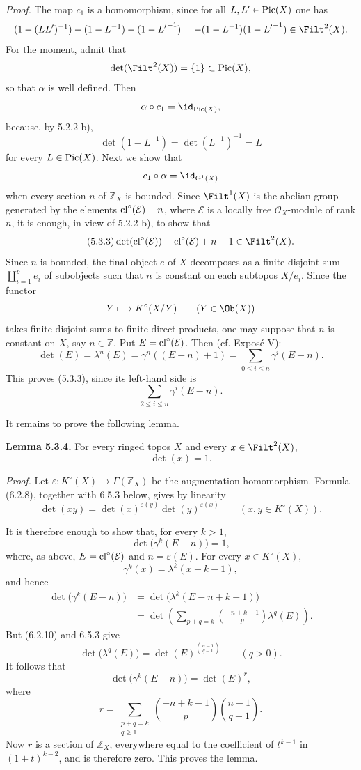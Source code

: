 \emph{Proof.}
The map $c_1$ is a homomorphism, since for all $L,L'\in\operatorname{Pic}(X)$ one has
\[
(1-(LL')^{-1})-(1-L^{-1})-(1-{L'}^{-1})
=-(1-L^{-1})(1-{L'}^{-1})\in\Filt^2(X).
\]
For the moment, admit that
\[
\det(\Filt^2(X))=\{1\}\subset\Pic(X),
\]
so that $\alpha$ is well defined. Then
\[
\alpha\circ c_1=\id_{\Pic(X)},
\]
because, by 5.2.2 b),
\[
\det(1-L^{-1})=\det(L^{-1})^{-1}=L
\]
for every $L\in\operatorname{Pic}(X)$. Next we show that
\[
c_1\circ\alpha=\id_{\Gr^1(X)}
\]
when every section $n$ of $\mathbb Z_X$ is bounded. Since $\Filt^1(X)$ is
the abelian group generated by the elements $\operatorname{cl}^\circ(\mathcal E)-n$, where
$\mathcal E$ is a locally free $\mathcal O_X$-module of rank $n$, it is
enough, in view of 5.2.2 b), to show that
\begin{equation}\tag{5.3.3}
\det(\cl^\circ(\mathcal E))-\cl^\circ(\mathcal E)+n-1\in\Filt^2(X).
\end{equation}
Since $n$ is bounded, the final object $e$ of $X$ decomposes as a finite
disjoint sum $\coprod_{i=1}^p e_i$ of subobjects such that $n$ is constant on
each subtopos $X/e_i$. Since the functor
\[
Y\longmapsto K^\circ(X/Y)\qquad(Y\in\Ob(X))
\]
takes finite disjoint sums to finite direct products, one may suppose that
$n$ is constant on $X$, say $n\in\mathbb Z$. Put
$E=\operatorname{cl}^\circ(\mathcal E)$. Then (cf. Expos\'e V):
\[
\det(E)=\lambda^n(E)=\gamma^n((E-n)+1)
=\sum_{0\leq i\leq n}\gamma^i(E-n).
\]
This proves (5.3.3), since its left-hand side is
\[
\sum_{2\leq i\leq n}\gamma^i(E-n).
\]

It remains to prove the following lemma.

\textbf{Lemma 5.3.4.}
For every ringed topos $X$ and every $x\in\Filt^2(X)$,
\[
\det(x)=1.
\]

\emph{Proof.}
Let $\varepsilon:K^\circ(X)\to\Gamma(\mathbb Z_X)$ be the augmentation
homomorphism. Formula (6.2.8), together with 6.5.3 below, gives by linearity
\begin{equation}\tag{5.3.5}
\det(xy)=\det(x)^{\varepsilon(y)}\det(y)^{\varepsilon(x)}
\qquad(x,y\in K^\circ(X)).
\end{equation}

It is therefore enough to show that, for every $k>1$,
\[
\det\bigl(\gamma^k(E-n)\bigr)=1,
\]
where, as above, $E=\operatorname{cl}^\circ(\mathcal E)$ and
$n=\varepsilon(E)$. For every $x\in K^\circ(X)$,
\[
\gamma^k(x)=\lambda^k(x+k-1),
\]
and hence
\[
\begin{aligned}
\det\bigl(\gamma^k(E-n)\bigr)
&=\det\bigl(\lambda^k(E-n+k-1)\bigr)\\
&=\det\left(
\sum_{p+q=k}\binom{-n+k-1}{p}\lambda^q(E)
\right).
\end{aligned}
\]
But (6.2.10) and 6.5.3 give
\[
\det\bigl(\lambda^q(E)\bigr)
=\det(E)^{\binom{n-1}{q-1}}
\qquad(q>0).
\]
It follows that
\[
\det\bigl(\gamma^k(E-n)\bigr)=\det(E)^r,
\]
where
\[
r=\sum_{\substack{p+q=k\\q\geq1}}
\binom{-n+k-1}{p}\binom{n-1}{q-1}.
\]
Now $r$ is a section of $\mathbb Z_X$, everywhere equal to the coefficient of
$t^{k-1}$ in $(1+t)^{k-2}$, and is therefore zero. This proves the lemma.

